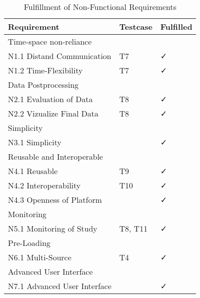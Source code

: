 \begin{table}
    \centering
    \small
    \begin{tabular}{L{0.35\textwidth}C{0.19\textwidth}C{0.19\textwidth}}
    \hline
Requirement                             & Testcase & Fulfilled  \\ \hline
    Time-space non-reliance     &   &          \\ \hline
    N1.1 Distand Communication      & T7 & \faCheck           \\
    N1.2 Time-Flexibility           & T7 & \faCheck            \\ \hline
    Data Postprocessing &      &       \\ \hline
    N2.1 Evaluation of Data         &  T8 &   \faCheck          \\
    N2.2 Vizualize Final Data       & T8 &  \faCheck         \\ \hline
    Simplicity                  &    &        \\ \hline
    N3.1 Simplicity                 &  &  \faCheck      \\\hline
    Reusable and Interoperable  &       &      \\ \hline
    N4.1 Reusable                   & T9 &  \faCheck         \\
    N4.2 Interoperability           & T10 &  \faCheck        \\
    N4.3 Openness of Platform       & &  \faCheck \\\hline
    Monitoring                  &  &           \\ \hline
    N5.1 Monitoring of Study        & T8, T11 &  \faCheck         \\ \hline
    Pre-Loading                 &     &        \\ \hline
    N6.1 Multi-Source             & T4 &  \faCheck          \\ \hline
    Advanced User Interface   &    &         \\ \hline
    N7.1 Advanced User Interface  & & \faCheck         \\ \hline
    \end{tabular}
    \caption[Fulfillment of Non-Functional Requirements]{Fulfillment of Non-Functional Requirements}\label{tab:NonFuncRequirementsCatCheck}
    \end{table}



